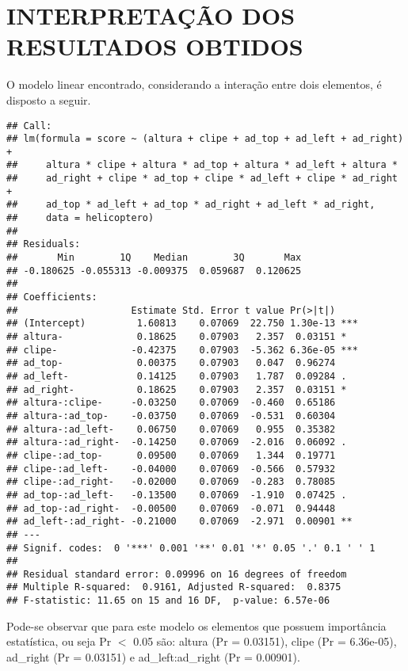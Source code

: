 \section*{INTERPRETAÇÃO DOS RESULTADOS OBTIDOS}
O modelo linear encontrado, considerando a interação entre dois elementos, é disposto a seguir.

\begin{knitrout}
\color{fgcolor}\begin{kframe}
\begin{verbatim}
## Call:
## lm(formula = score ~ (altura + clipe + ad_top + ad_left + ad_right) + 
##     altura * clipe + altura * ad_top + altura * ad_left + altura * 
##     ad_right + clipe * ad_top + clipe * ad_left + clipe * ad_right + 
##     ad_top * ad_left + ad_top * ad_right + ad_left * ad_right, 
##     data = helicoptero)
## 
## Residuals:
##       Min        1Q    Median        3Q       Max 
## -0.180625 -0.055313 -0.009375  0.059687  0.120625 
## 
## Coefficients:
##                    Estimate Std. Error t value Pr(>|t|)    
## (Intercept)         1.60813    0.07069  22.750 1.30e-13 ***
## altura-             0.18625    0.07903   2.357  0.03151 *  
## clipe-             -0.42375    0.07903  -5.362 6.36e-05 ***
## ad_top-             0.00375    0.07903   0.047  0.96274    
## ad_left-            0.14125    0.07903   1.787  0.09284 .  
## ad_right-           0.18625    0.07903   2.357  0.03151 *  
## altura-:clipe-     -0.03250    0.07069  -0.460  0.65186    
## altura-:ad_top-    -0.03750    0.07069  -0.531  0.60304    
## altura-:ad_left-    0.06750    0.07069   0.955  0.35382    
## altura-:ad_right-  -0.14250    0.07069  -2.016  0.06092 .  
## clipe-:ad_top-      0.09500    0.07069   1.344  0.19771    
## clipe-:ad_left-    -0.04000    0.07069  -0.566  0.57932    
## clipe-:ad_right-   -0.02000    0.07069  -0.283  0.78085    
## ad_top-:ad_left-   -0.13500    0.07069  -1.910  0.07425 .  
## ad_top-:ad_right-  -0.00500    0.07069  -0.071  0.94448    
## ad_left-:ad_right- -0.21000    0.07069  -2.971  0.00901 ** 
## ---
## Signif. codes:  0 '***' 0.001 '**' 0.01 '*' 0.05 '.' 0.1 ' ' 1
## 
## Residual standard error: 0.09996 on 16 degrees of freedom
## Multiple R-squared:  0.9161,	Adjusted R-squared:  0.8375 
## F-statistic: 11.65 on 15 and 16 DF,  p-value: 6.57e-06
\end{verbatim}
\end{kframe}
\end{knitrout}

Pode-se observar que para este modelo os elementos que possuem importância estatística, ou seja Pr $<$ 0.05 são: altura (Pr = 0.03151), clipe (Pr = 6.36e-05), ad\_right (Pr = 0.03151) e ad\_left:ad\_right (Pr = 0.00901). 

